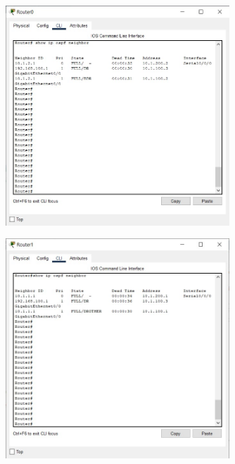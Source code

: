 \documentclass{article}
\begin{document}
\section{}%
\begin{figure}[H]
    \centering
    \includegraphics[width=0.75\textwidth]{figures/18.jpg}
    \caption{}
    \label{fig:fig1}
\end{figure}
\begin{figure}[H]
    \centering
    \includegraphics[width=0.75\textwidth]{figures/19.jpg}
    \caption{}
    \label{fig:fig1}
\end{figure}
\end{document}
